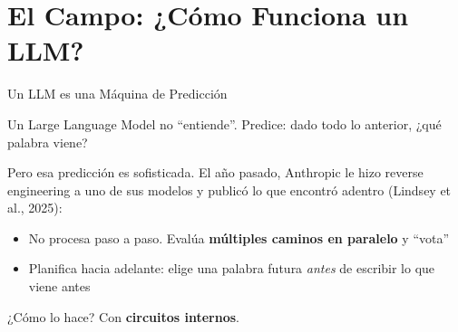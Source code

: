 \documentclass[aspectratio=169, 12pt]{beamer}
\begin{document}
\section{El Campo: ¿C\'omo Funciona un LLM?}

\begin{frame}{Un LLM es una M\'aquina de Predicci\'on}

Un Large Language Model no ``entiende''. Predice: dado todo lo anterior, ¿qu\'e palabra viene?

\vspace{1em}

Pero esa predicci\'on es sofisticada. El a\~no pasado, Anthropic le hizo reverse engineering a uno de sus modelos y public\'o lo que encontr\'o adentro (Lindsey et al., 2025):

\vspace{1em}

\begin{itemize}
    \item No procesa paso a paso. Eval\'ua \textbf{m\'ultiples caminos en paralelo} y ``vota''
    \item Planifica hacia adelante: elige una palabra futura \emph{antes} de escribir lo que viene antes
\end{itemize}

\vspace{1em}

¿C\'omo lo hace? Con \textbf{circuitos internos}.

\end{frame}
\end{document}

